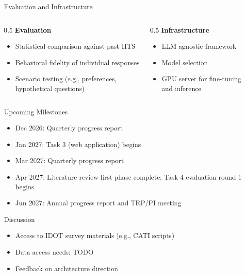 \documentclass{beamer}
\begin{document}
\begin{frame}{Evaluation and Infrastructure}
\begin{columns}[t]
\begin{column}{0.5\textwidth}
\textbf{Evaluation}
\begin{itemize}
\item Statistical comparison against past HTS
\item Behavioral fidelity of individual responses
\item Scenario testing (e.g., preferences, hypothetical questions)
\end{itemize}
\end{column}
\begin{column}{0.5\textwidth}
\textbf{Infrastructure}
\begin{itemize}
\item LLM-agnostic framework
\item Model selection
\item GPU server for fine-tuning and inference
\end{itemize}
\end{column}
\end{columns}
\end{frame}



\begin{frame}{Upcoming Milestones}
\begin{itemize}
\item Dec 2026: Quarterly progress report
\item Jan 2027: Task 3 (web application) begins
\item Mar 2027: Quarterly progress report
\item Apr 2027: Literature review first phase complete; Task 4 evaluation round 1 begins
\item Jun 2027: Annual progress report and TRP/PI meeting
\end{itemize}
\end{frame}


\begin{frame}{Discussion}
\begin{itemize}
\item Access to IDOT survey materials (e.g., CATI scripts)
\item Data access needs: TODO
\item Feedback on architecture direction
\end{itemize}
\end{frame}


\backmatter
\end{document}
